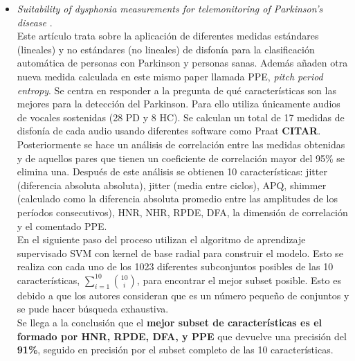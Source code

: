 \begin{itemize}
	\item \textit{Suitability of dysphonia measurements for telemonitoring of Parkinson’s disease} \cite{MxLtSuitability}.\\
	Este artículo trata sobre la aplicación de diferentes medidas estándares (lineales) y no estándares (no lineales) de disfonía para la clasificación automática de personas con Parkinson y personas sanas. Además añaden otra nueva medida calculada en este mismo paper llamada PPE, \textit{pitch period entropy}. Se centra en responder a la pregunta de qué características son las mejores para la detección del Parkinson. Para ello utiliza únicamente audios de vocales sostenidas (28 PD y 8 HC). Se calculan un total de 17 medidas de disfonía de cada audio usando diferentes software como Praat \textbf{CITAR}. Posteriormente se hace un análisis de correlación entre las medidas obtenidas y de aquellos pares que tienen un coeficiente de correlación mayor del 95\% se elimina una. Después de este análisis se obtienen 10 características: jitter (diferencia absoluta absoluta), jitter (media entre ciclos), APQ, shimmer (calculado como la diferencia absoluta promedio entre las amplitudes de los períodos consecutivos), HNR, NHR, RPDE, DFA, la dimensión de correlación y el comentado PPE.\\ En el siguiente paso del proceso utilizan el algoritmo de aprendizaje supervisado SVM con kernel de base radial para construir el modelo. Esto se realiza con cada uno de los 1023 diferentes subconjuntos posibles de las 10 características, $\sum_{i=1}^{10} \binom{10}{i}$, para encontrar el mejor subset posible. Esto es debido a que los autores consideran que es un número pequeño de conjuntos y se pude hacer búsqueda exhaustiva. \\ Se llega a la conclusión que el \textbf{mejor subset de características es el formado por HNR, RPDE, DFA, y PPE} que devuelve una precisión del \textbf{91\%}, seguido en precisión por el subset completo de las 10 características.
	

\end{itemize}
